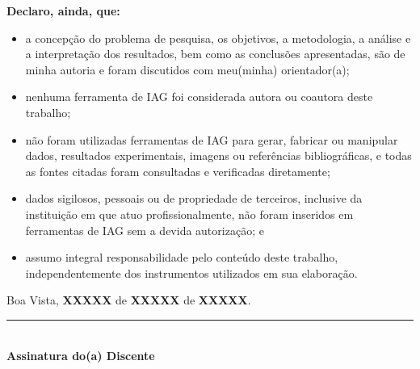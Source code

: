 \noindent\textbf{Declaro, ainda, que:}
\begin{itemize}
    \item a concepção do problema de pesquisa, os objetivos, a metodologia, a análise e a interpretação dos resultados, bem como as conclusões apresentadas, são de minha autoria e foram discutidos com meu(minha) orientador(a);
    \item nenhuma ferramenta de IAG foi considerada autora ou coautora deste trabalho;
    \item não foram utilizadas ferramentas de IAG para gerar, fabricar ou manipular dados, resultados experimentais, imagens ou referências bibliográficas, e todas as fontes citadas foram consultadas e verificadas diretamente;
    \item dados sigilosos, pessoais ou de propriedade de terceiros, inclusive da instituição em que atuo profissionalmente, não foram inseridos em ferramentas de IAG sem a devida autorização; e
    \item assumo integral responsabilidade pelo conteúdo deste trabalho, independentemente dos instrumentos utilizados em sua elaboração.
\end{itemize}

\vspace{0.5cm}


\vspace{1cm}
\begin{flushright}
    Boa Vista, \textbf{XXXXX} de \textbf{XXXXX} de \textbf{XXXXX}.
\end{flushright}

\vspace{1.5cm}

\begin{center}
    \rule{8cm}{0.4pt} \\
    \textbf{Assinatura do(a) Discente}

\end{center}
